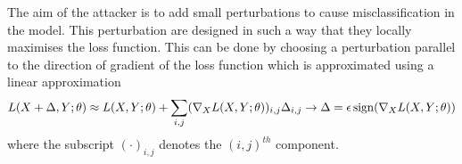 The aim of the attacker is to add small perturbations to cause misclassification in the model.
This perturbation are designed in such a way that they locally maximises the loss function. This can be done by choosing a perturbation parallel to the direction of gradient of the loss function which is approximated using a linear approximation
\begin{equation}\label{eq:FGSM_linear_approx}
 L(X+\Delta,Y;\theta)\approx L(X,Y;\theta)+\sum_{i,j}(\nabla_{X}L(X,Y;\theta))_{i,j}\Delta_{i,j}\rightarrow \Delta = \epsilon\, {\rm sign}(\nabla_{X}L(X,Y;\theta))
\end{equation}
where the subscript $(\cdot)_{i,j}$ denotes the $(i,j)^{th}$ component.
